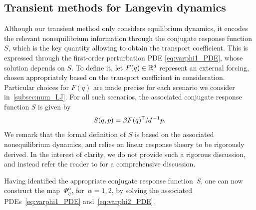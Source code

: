 %
\subsection{Transient methods for Langevin dynamics}
\label{subsec:num_lang}
%
%
Although our transient method only considers equilibrium dynamics, it encodes the relevant nonequilibrium information through the conjugate  response function $S$, which is the key quantity allowing to obtain the transport coefficient. This is expressed through the first-order perturbation PDE \eqref{eq:varphi1_PDE}, whose solution depends on $S$. To define it, let $F(q) \in \mathbb{R}^{d}$ represent an external forcing, chosen appropriately based on the transport coefficient in consideration. Particular choices for $F(q)$ are made precise for each scenario we consider in~\cref{subsec:num_LJ}. For all such scenarios, the associated conjugate response function $S$ is given by
%
\begin{equation}
    S(q,p) = \beta F(q)^\mathsf T M^{-1} p.
    \label{eq:conj_res}
\end{equation}
%
We remark that the formal definition of $S$ is based on the associated nonequilibrium dynamics, and relies on linear response theory to be rigorously derived. In the interest of clarity, we do not provide such a rigorous discussion, and instead refer the reader to \cite[Section 5.2.3]{lelievre2016} for a comprehensive discussion.

Having identified the appropriate conjugate response function~$S$, one can now construct the map~$\Phi_\eta^\alpha$, for~$\alpha=1,2$, by solving the associated PDEs~\eqref{eq:varphi1_PDE} and~\eqref{eq:varphi2_PDE}. 
%
%

